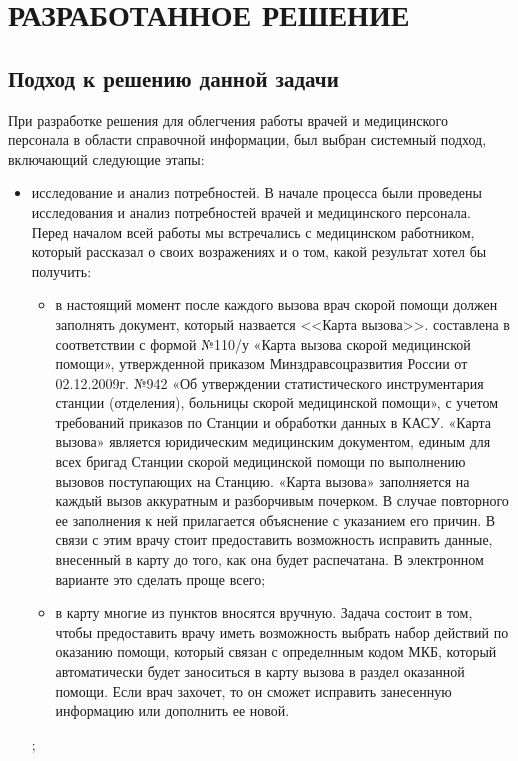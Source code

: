 \section{РАЗРАБОТАННОЕ РЕШЕНИЕ}

\subsection{Подход к решению данной задачи}

При разработке решения для облегчения работы врачей и медицинского персонала в области справочной информации, был выбран системный подход, включающий следующие этапы:
\begin{itemize}

 \item исследование и анализ потребностей. В начале процесса были проведены исследования и анализ потребностей врачей и медицинского персонала. Перед началом всей работы мы встречались с медицинском работником, который рассказал о своих возражениях и о том, какой результат хотел бы получить:
 \begin{itemize}
     \item в настоящий момент после каждого вызова врач скорой помощи должен заполнять документ, который назвается <<Карта вызова>>. составлена в соответствии с формой №110/у «Карта вызова скорой медицинской помощи», утвержденной  приказом Минздравсоцразвития России от 02.12.2009г. №942 «Об утверждении статистического инструментария станции (отделения), больницы скорой медицинской помощи», с учетом требований приказов по Станции и обработки данных в КАСУ. «Карта вызова» является юридическим медицинским документом, единым для всех бригад Станции скорой медицинской помощи по выполнению вызовов поступающих на Станцию. «Карта вызова» заполняется на каждый вызов аккуратным и разборчивым почерком. В случае повторного ее заполнения к ней прилагается объяснение с указанием его причин.
     В связи с этим врачу стоит предоставить возможность исправить данные, внесенный в карту до того, как она будет распечатана. В электронном варианте это сделать проще всего;
     \item в карту многие из пунктов вносятся вручную. Задача состоит в том, чтобы предоставить врачу иметь возможность выбрать набор действий по оказанию помощи, который связан с определнным кодом МКБ, который автоматически будет заноситься в карту вызова в раздел оказанной помощи. Если врач захочет, то он сможет исправить занесенную информацию или дополнить ее новой.
 \end{itemize};


\end{itemize}
